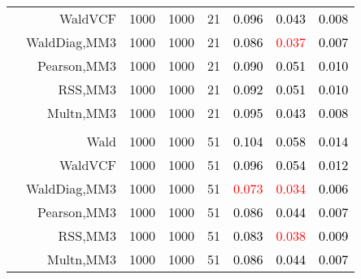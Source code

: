 \documentclass[
]{article}
\begin{document}
\begin{table}[H]
{\begin{tabular}[t]{lrrrrrrr}
\hspace{1em} & WaldVCF & 1000 & 1000 & 21 & \textcolor{black}{0.096} & \textcolor{black}{0.043} & \textcolor{black}{0.008}\\

\hspace{1em} & WaldDiag,MM3 & 1000 & 1000 & 21 & \textcolor{black}{0.086} & \textcolor{red}{0.037} & \textcolor{black}{0.007}\\

\hspace{1em} & Pearson,MM3 & 1000 & 1000 & 21 & \textcolor{black}{0.090} & \textcolor{black}{0.051} & \textcolor{black}{0.010}\\

\hspace{1em} & RSS,MM3 & 1000 & 1000 & 21 & \textcolor{black}{0.092} & \textcolor{black}{0.051} & \textcolor{black}{0.010}\\

\hspace{1em} & Multn,MM3 & 1000 & 1000 & 21 & \textcolor{black}{0.095} & \textcolor{black}{0.043} & \textcolor{black}{0.008}\\
\cmidrule{1-8}
\addlinespace[0.3em]
\multicolumn{8}{l}{\textbf{3F 15V}}\\
\hspace{1em} & Wald & 1000 & 1000 & 51 & \textcolor{black}{0.104} & \textcolor{black}{0.058} & \textcolor{black}{0.014}\\

\hspace{1em} & WaldVCF & 1000 & 1000 & 51 & \textcolor{black}{0.096} & \textcolor{black}{0.054} & \textcolor{black}{0.012}\\

\hspace{1em} & WaldDiag,MM3 & 1000 & 1000 & 51 & \textcolor{red}{0.073} & \textcolor{red}{0.034} & \textcolor{black}{0.006}\\

\hspace{1em} & Pearson,MM3 & 1000 & 1000 & 51 & \textcolor{black}{0.086} & \textcolor{black}{0.044} & \textcolor{black}{0.007}\\

\hspace{1em} & RSS,MM3 & 1000 & 1000 & 51 & \textcolor{black}{0.083} & \textcolor{red}{0.038} & \textcolor{black}{0.009}\\

\hspace{1em} & Multn,MM3 & 1000 & 1000 & 51 & \textcolor{black}{0.086} & \textcolor{black}{0.044} & \textcolor{black}{0.007}\\
\bottomrule
\end{tabular}}
\endgroup{}
\end{table}
\end{document}
